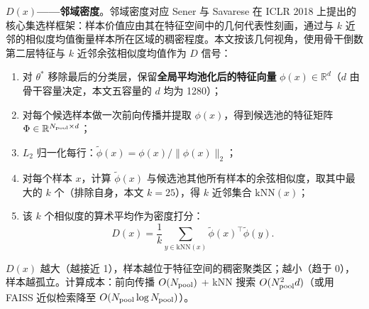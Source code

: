 \documentclass[UTF8,openany,12pt]{ctexbook}
\begin{document}
\textbf{$D(x)$——邻域密度}。邻域密度对应 Sener 与 Savarese\cite{sener2018active} 在 ICLR 2018 上提出的核心集选样框架：样本价值应由其在特征空间中的几何代表性刻画，通过与 $k$ 近邻的相似度均值衡量样本所在区域的稠密程度。本文按该几何视角，使用骨干倒数第二层特征与 $k$ 近邻余弦相似度均值作为 $D$ 信号：
\begin{enumerate}[leftmargin=2em,nosep]
\item 对 $\theta^{\ast}$ 移除最后的分类层，保留\textbf{全局平均池化后的特征向量} $\phi(x) \in \mathbb{R}^{d}$（$d$ 由骨干容量决定，本文五容量的 $d$ 均为 1280）；
\item 对每个候选样本做一次前向传播并提取 $\phi(x)$，得到候选池的特征矩阵 $\Phi \in \mathbb{R}^{N_{\rm pool} \times d}$；
\item $L_2$ 归一化每行：$\tilde{\phi}(x) = \phi(x) / \|\phi(x)\|_2$；
\item 对每个样本 $x$，计算 $\tilde{\phi}(x)$ 与候选池其他所有样本的余弦相似度，取其中最大的 $k$ 个（排除自身，本文 $k = 25$），得 $k$ 近邻集合 $\mathrm{kNN}(x)$；
\item 该 $k$ 个相似度的算术平均作为密度打分：
\begin{equation}
D(x) = \frac{1}{k}\sum_{y \in \mathrm{kNN}(x)} \tilde{\phi}(x)^{\top}\tilde{\phi}(y).
\label{eq:D-implement}
\end{equation}
\end{enumerate}
$D(x)$ 越大（越接近 1），样本越位于特征空间的稠密聚类区；越小（趋于 0），样本越孤立。计算成本：前向传播 $O(N_{\rm pool})$ + kNN 搜索 $O(N_{\rm pool}^2 d)$（或用 FAISS 近似检索降至 $O(N_{\rm pool} \log N_{\rm pool})$）。
\end{document}
